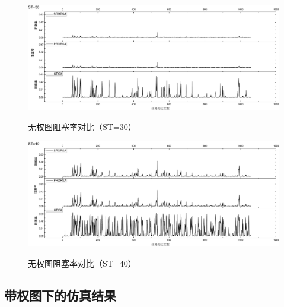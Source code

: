\begin{figure}
\setlength{\belowcaptionskip}{-0.5cm}
\begin{center}
{\includegraphics[width=1 \textwidth]{figures/B30Z.pdf}}
\end{center}
\caption{{\footnotesize{无权图阻塞率对比（ST=30）}}}
\label{B40Z}
\end{figure}
\begin{figure}
\setlength{\belowcaptionskip}{-0.5cm}
\begin{center}
{\includegraphics[width=1 \textwidth]{figures/B40Z.pdf}}
\end{center}
\caption{{\footnotesize{无权图阻塞率对比（ST=40）}}}
\label{B40Z}
\end{figure}

\subsection{带权图下的仿真结果}
